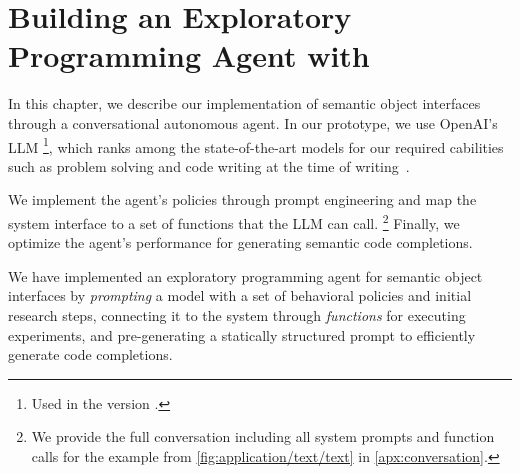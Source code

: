 
\chapter{Building an Exploratory Programming Agent with \gptfouro}
\label{cha:agent}

In this chapter, we describe our implementation of semantic object interfaces through a conversational autonomous agent.
In our prototype, we use OpenAI's LLM \gptfouro\footnote{Used in the version .}, which ranks among the state-of-the-art models for our required cabilities such as problem solving and code writing at the time of writing~\cite{openai2024gpt4}.

We implement the agent's policies through prompt engineering and map the system interface to a set of functions that the LLM can call.%
\footnote{We provide the full conversation including all system prompts and function calls for the example from \cref{fig:application/text/text} in \cref{apx:conversation}.} %
Finally, we optimize the agent's performance for generating semantic code completions.


\begin{summary}
	We have implemented an exploratory programming agent for semantic object interfaces by \emph{prompting} a \gptfouro model with a set of behavioral policies and initial research steps, connecting it to the system through \emph{functions} for executing experiments, and pre-generating a statically structured prompt to efficiently generate code completions.
\end{summary}
